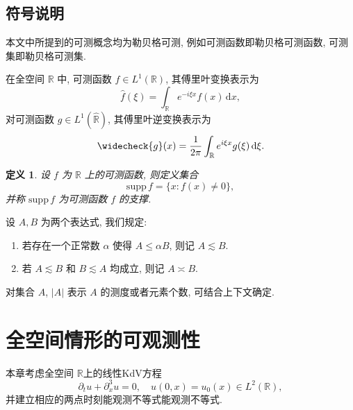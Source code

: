 \documentclass[master]{cugthesis}
\newcommand\R{\ensuremath{\mathbb{R}}}
\newcommand\Z{\ensuremath{\mathbb{Z}}}
\newcommand\T{\ensuremath{\mathbb{T}}}
\renewcommand\d{\ensuremath{\,\mathrm{d}}}
\newtheorem{definition}{定义}[chapter]
\begin{document}
    


    
    

    \iffalse 论文的第二部分考虑圆周 $\T:= \R / \Z$ 上的线性KdV方程.\cite{Ionescu2006UniquenessPO}
    \fi
    
    
    \section{符号说明}
    
    本文中所提到的可测概念均为勒贝格可测, 例如可测函数即勒贝格可测函数, 可测集即勒贝格可测集. 
    
    在全空间 $\R$ 中, 可测函数 $f\in L^1(\R)$, 其傅里叶变换表示为
    \begin{equation*}
        \widehat{f}(\xi)=\int_{\R} e^{-i\xi x} f(x)\d x,
    \end{equation*}
    对可测函数 $g\in L^1(\widehat{\R}) $, 其傅里叶逆变换表示为
    \begin{equation*}
        \widecheck{g}(x)=\frac{1}{2\pi}\int_{\R} e^{i\xi x} g(\xi) \d \xi.
    \end{equation*}
    
    \begin{definition}
    设 $f$ 为 $\R$ 上的可测函数, 则定义集合
    \begin{equation*}
        \mathrm{supp}\, f= \lbrace x: f(x)\neq 0 \rbrace,
    \end{equation*}
    并称 $\mathrm{supp}\, f$ 为可测函数 $f$ 的支撑.
    \end{definition}
    
    设 $A, B$ 为两个表达式, 我们规定:
    \begin{enumerate}
        \item 若存在一个正常数 $\alpha$ 使得 $A\le \alpha B$, 则记 $A\lesssim B$.
        \item 若 $A\lesssim B$ 和 $B\lesssim A$ 均成立, 则记 $A\asymp B$.
    \end{enumerate}
    
    对集合 $A$, $|A|$ 表示 $A$ 的测度或者元素个数, 可结合上下文确定. 
    
    


    \chapter{全空间情形的可观测性}
    本章考虑全空间 $\R $上的线性KdV方程
        \begin{equation}
        \partial_t u+\partial_x^3 u=0,\quad u(0,x)=u_0(x)\in L^2(\R),\label{kdv-r}
    \end{equation} 
    并建立相应的两点时刻能观测不等式能观测不等式. 
\end{document}
